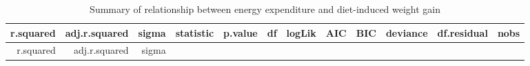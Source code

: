 \documentclass[]{article}
\begin{document}
\begin{longtable}[]{@{}rrrrrrrrrrrr@{}}
\caption{Summary of relationship between energy expenditure and
diet-induced weight gain}\tabularnewline
\toprule
\begin{minipage}[b]{0.08\columnwidth}\raggedleft
r.squared\strut
\end{minipage} & \begin{minipage}[b]{0.11\columnwidth}\raggedleft
adj.r.squared\strut
\end{minipage} & \begin{minipage}[b]{0.05\columnwidth}\raggedleft
sigma\strut
\end{minipage} & \begin{minipage}[b]{0.08\columnwidth}\raggedleft
statistic\strut
\end{minipage} & \begin{minipage}[b]{0.06\columnwidth}\raggedleft
p.value\strut
\end{minipage} & \begin{minipage}[b]{0.02\columnwidth}\raggedleft
df\strut
\end{minipage} & \begin{minipage}[b]{0.05\columnwidth}\raggedleft
logLik\strut
\end{minipage} & \begin{minipage}[b]{0.03\columnwidth}\raggedleft
AIC\strut
\end{minipage} & \begin{minipage}[b]{0.03\columnwidth}\raggedleft
BIC\strut
\end{minipage} & \begin{minipage}[b]{0.07\columnwidth}\raggedleft
deviance\strut
\end{minipage} & \begin{minipage}[b]{0.09\columnwidth}\raggedleft
df.residual\strut
\end{minipage} & \begin{minipage}[b]{0.04\columnwidth}\raggedleft
nobs\strut
\end{minipage}\tabularnewline
\midrule
\endfirsthead
\toprule
\begin{minipage}[b]{0.08\columnwidth}\raggedleft
r.squared\strut
\end{minipage} & \begin{minipage}[b]{0.11\columnwidth}\raggedleft
adj.r.squared\strut
\end{minipage} & \begin{minipage}[b]{0.05\columnwidth}\raggedleft
sigma\strut
\end{minipage} & \begin{minipage}[b]{0.08\columnwidth}\raggedleft

\end{minipage}
\end{longtable}
\end{document}
